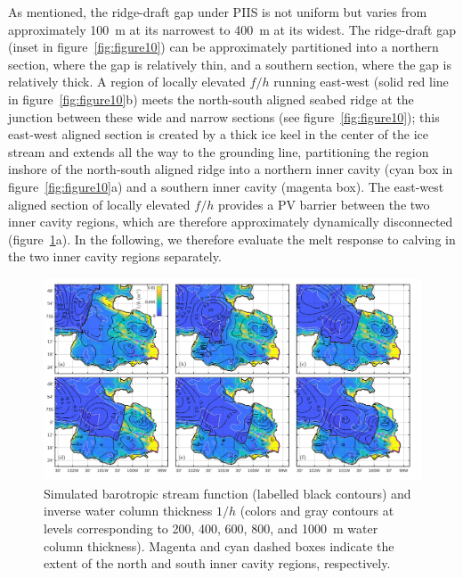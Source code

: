 \documentclass[draft]{agujournal2019}
\begin{document}
As mentioned, the ridge-draft gap under PIIS is not uniform but varies from approximately 100~m at its narrowest to 400~m at its widest.  The ridge-draft gap (inset in figure~\ref{fig:figure10}) can be approximately partitioned into a northern section, where the gap is relatively thin, and a southern section, where the gap is relatively thick. A region of locally elevated $f/h$ running east-west (solid red line in figure~\ref{fig:figure10}b) meets the north-south aligned seabed ridge at the junction between these wide and narrow sections (see figure~\ref{fig:figure10}); this east-west aligned section is created by a thick ice keel in the center of the ice stream and extends all the way to the grounding line, partitioning the region inshore of the north-south aligned ridge into a northern inner cavity (cyan box in figure~\ref{fig:figure10}a) and a southern inner cavity (magenta box). The east-west aligned section of locally elevated $f/h$  provides a PV barrier between the two inner cavity regions, which are therefore approximately dynamically disconnected (figure~\ref{fig:figure11}a). In the following, we therefore evaluate the melt response to calving in the two inner cavity regions separately.

\begin{figure}
    \centering
    \includegraphics[width = \textwidth]{plots/figure11.png}
    \caption{Simulated barotropic stream function (labelled black contours) and inverse water column thickness $1/h$ (colors and gray contours at levels corresponding to 200, 400, 600, 800, and 1000~m water column thickness). Magenta and cyan dashed boxes indicate the extent of the north and south inner cavity regions, respectively.}
    \label{fig:figure11}
\end{figure}
\end{document}
